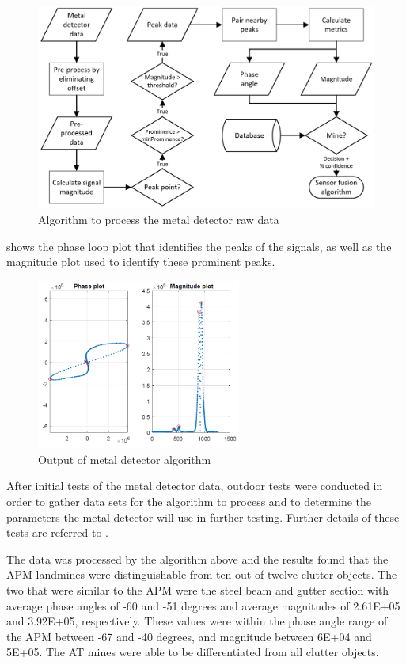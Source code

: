 \documentclass[main.tex]{subfiles}
\begin{document}
\begin{figure}[ht]
\includegraphics[width=\textwidth]{4-DetailedDesign/MDflow.PNG}
\centering
\caption{Algorithm to process the metal detector raw data}
\end{figure}

 shows the phase loop plot that identifies the peaks of the signals, as well as the magnitude plot used to identify these prominent peaks.

\begin{figure}[ht]
\includegraphics[width=0.6\textwidth]{4-DetailedDesign/phase.PNG}
\centering
\caption{Output of metal detector algorithm} 
\end{figure}

After initial tests of the metal detector data, outdoor tests were conducted in order to gather data sets for the algorithm to process and to determine the parameters the metal detector will use in further testing. Further details of these tests are referred to . 

The data was processed by the algorithm above and the results found that the APM landmines were distinguishable from ten out of twelve clutter objects. The two that were similar to the APM were the steel beam and gutter section with average phase angles of -60 and -51 degrees and average magnitudes of 2.61E+05 and 3.92E+05, respectively. These values were within the phase angle range of the APM between -67 and -40 degrees, and magnitude between 6E+04 and 5E+05. The AT mines were able to be differentiated from all clutter objects. 
\end{document}
